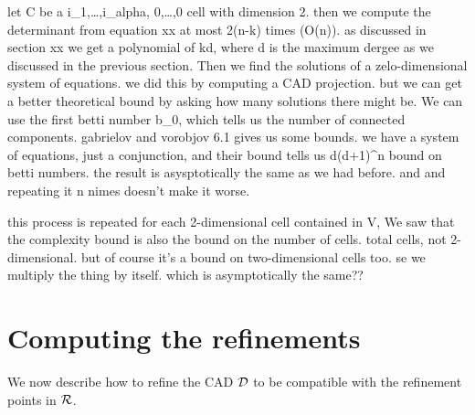 \documentclass[
]{book}
\theoremstyle{definition}
\theoremstyle{definition}
\theoremstyle{definition}
\theoremstyle{definition}
\theoremstyle{remark}
\begin{document}
let C be a i\_1,\ldots,i\_alpha, 0,\ldots,0 cell with dimension 2. then we compute the determinant from equation xx at most 2(n-k) times (O(n)).
as discussed in section xx we get a polynomial of kd, where d is the maximum dergee as we discussed in the previous section. Then we find the solutions of a zelo-dimensional system of equations. we did this by computing a CAD projection. but we can get a better theoretical bound by asking how many solutions there might be. We can use the first betti number b\_0, which tells us the number of connected components. gabrielov and vorobjov 6.1 gives us some bounds. we have a system of equations, just a conjunction, and their bound tells us d(d+1)\^{}n bound on betti numbers. the result is asysptotically the same as we had before. and and repeating it n nimes doesn't make it worse.

this process is repeated for each 2-dimensional cell contained in V, We saw that the complexity bound is also the bound on the number of cells. total cells, not 2-dimensional. but of course it's a bound on two-dimensional cells too. se we multiply the thing by itself. which is asymptotically the same??

\hypertarget{sec:compute-refinement}{%
\section{Computing the refinements}\label{sec:compute-refinement}}

We now describe how to refine the CAD \(\cal D\) to be compatible with the refinement points in \(\cal R\).
\end{document}
